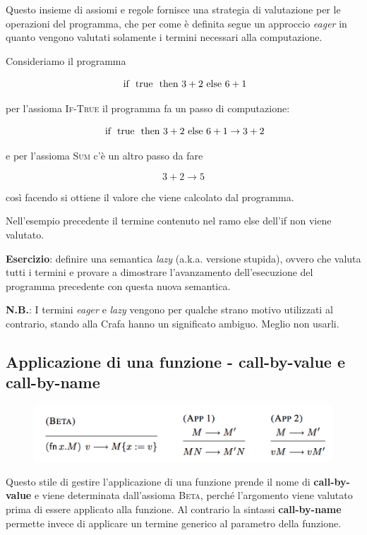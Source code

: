 Questo insieme di assiomi e regole fornisce una strategia di valutazione per le operazioni del programma, che per come è definita segue un approccio \textit{eager} in quanto vengono valutati solamente i termini necessari alla computazione.

Consideriamo il programma 

$$
\text{ if } \text{ true } \text{ then } 3+2 \text{ else } 6+1
$$

per l'assioma \textsc{If-True} il programma fa un passo di computazione:

$$
\text{ if } \text{ true } \text{ then } 3+2 \text{ else } 6+1 \rightarrow 3+2
$$

e per l'assioma \textsc{Sum} c'è un altro passo da fare

$$
3+2 \rightarrow 5
$$

così facendo si ottiene il valore che viene calcolato dal programma.

Nell'esempio precedente il termine contenuto nel ramo else dell'if non viene valutato.

\textbf{Esercizio}: definire una semantica \textit{lazy} (a.k.a. versione stupida), ovvero che valuta tutti i termini e provare a dimostrare l'avanzamento dell'esecuzione del programma precedente con questa nuova semantica.

\textbf{N.B.}: I termini \textit{eager} e \textit{lazy} vengono per qualche strano motivo utilizzati al contrario, stando alla Crafa hanno un significato ambiguo. Meglio non usarli.

\subsection{Applicazione di una funzione - call-by-value e call-by-name}

\begin{figure}[htpb]
	\centering
	\includegraphics[width = 0.7\linewidth]{./images/l3-assiomi-2}
\end{figure}

Questo stile di gestire l'applicazione di una funzione prende il nome di \textbf{call-by-value} e viene determinata dall'assioma \textsc{Beta}, perché l'argomento viene valutato prima di essere applicato alla funzione.
Al contrario la sintassi \textbf{call-by-name} permette invece di applicare un termine generico al parametro della funzione.

